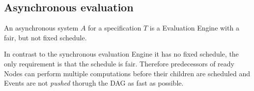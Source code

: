 

\subsection{Asynchronous evaluation}
\label{sec:concepts:behaviour_without_timing:async}

An asynchronous system \(A\) for a specification \(T\) is a Evaluation Engine with a fair, but not fixed schedule.






In contrast to the synchronous evaluation Engine it has no fixed schedule, the only requirement is that the schedule is fair.
Therefore predecessors of ready Nodes can perform multiple computations before their children are scheduled and Events are not \emph{pushed} thorugh the DAG as fast as possible.

